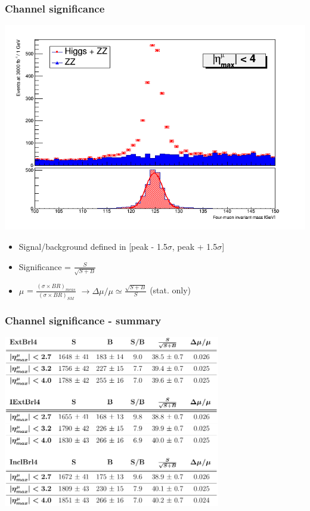 \documentclass{beamer}
\begin{document}

\begin{frame}[t]
\frametitle{Channel significance}
\begin{center}
\includegraphics[width=.5\textwidth]{SBInclBrl4}
\end{center}

\begin{itemize}
\item Signal/background defined in [peak - 1.5$\sigma$, peak + 1.5$\sigma$]
\item Significance = $\frac{S}{\sqrt{S + B}}$
\item $\mu$ = $\frac{(\sigma \times BR)_{meas}}{(\sigma \times BR)_{SM}}$ $\rightarrow 
\Delta\mu/\mu \simeq \frac{\sqrt{S + B}}{S}$ (stat. only)
\end{itemize}
\end{frame}


\begin{frame}
\frametitle{Channel significance - summary}
\centering
\includegraphics[width=.9\textwidth, height=7.5cm]{significance}
\end{frame}
\end{document}
